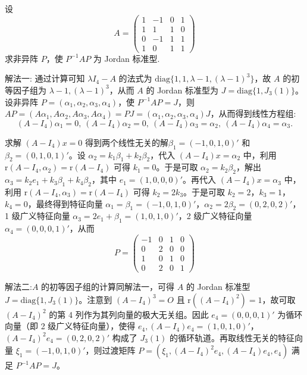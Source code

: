 \documentclass[../../main.tex]{subfiles}
\begin{document}
\begin{example}
设
\[
A = \begin{pmatrix}
1 & -1 & 0 & 1 \\
1 & 1 & 1 & 0 \\
0 & -1 & 1 & 1 \\
1 & 0 & 1 & 1
\end{pmatrix}
\]
求非异阵 $P$，使 $P^{-1}AP$ 为 Jordan 标准型.
\end{example}
\begin{solution}
{\color{blue}解法一:}
通过计算可知 $\lambda I_4 - A$ 的法式为 $\mathrm{diag}\{1,1,\lambda - 1,(\lambda - 1)^3\}$，故 $A$ 的初等因子组为 $\lambda - 1,(\lambda - 1)^3$，从而 $A$ 的 Jordan 标准型为 $J = \mathrm{diag}\{1,J_3(1)\}$。设非异阵 $P = (\alpha_1,\alpha_2,\alpha_3,\alpha_4)$，使 $P^{-1}AP = J$，则 $AP = (A\alpha_1,A\alpha_2,A\alpha_3,A\alpha_4) = PJ = (\alpha_1,\alpha_2,\alpha_3,\alpha_4)J$，从而得到线性方程组:
\[(A - I_4)\alpha_1 = 0,\ (A - I_4)\alpha_2 = 0,\ (A - I_4)\alpha_3 = \alpha_2,\ (A - I_4)\alpha_4 = \alpha_3.\]

求解 $(A - I_4)x = 0$ 得到两个线性无关的解$\beta_1 = (-1,0,1,0)'$ 和 $\beta_2 = (0,1,0,1)'$。设 $\alpha_2 = k_1\beta_1 + k_2\beta_2$，代入 $(A - I_4)x = \alpha_2$ 中，利用 $\mathrm{r}(A - I_4,\alpha_2) = \mathrm{r}(A - I_4)$ 可得 $k_1 = 0$。于是可取 $\alpha_2 = k_2\beta_2$，解出 $\alpha_3 = k_2e_1 + k_3\beta_1 + k_4\beta_2$，其中 $e_1 = (1,0,0,0)'$。再代入 $(A - I_4)x = \alpha_3$ 中，利用 $\mathrm{r}(A - I_4,\alpha_3) = \mathrm{r}(A - I_4)$ 可得 $k_2 = 2k_3$。于是可取 $k_2 = 2$，$k_3 = 1$，$k_4 = 0$，最终得到特征向量 $\alpha_1 = \beta_1 = (-1,0,1,0)'$，$\alpha_2 = 2\beta_2 = (0,2,0,2)'$，1 级广义特征向量 $\alpha_3 = 2e_1 + \beta_1 = (1,0,1,0)'$，2 级广义特征向量 $\alpha_4 = (0,0,0,1)'$，从而
\[
P = \begin{pmatrix}
-1 & 0 & 1 & 0 \\
0 & 2 & 0 & 0 \\
1 & 0 & 1 & 0 \\
0 & 2 & 0 & 1
\end{pmatrix}
\]

{\color{blue}解法二:}$A$ 的初等因子组的计算同解法一，可得 $A$ 的 Jordan 标准型 $J = \mathrm{diag}\{1,J_3(1)\}$。注意到 $(A - I_4)^3 = O$ 且 $\mathrm{r}((A - I_4)^2) = 1$，故可取 $(A - I_4)^2$ 的第 4 列作为其列向量的极大无关组。因此 $e_4 = (0,0,0,1)'$ 为循环向量（即 2 级广义特征向量），使得 $e_4,(A - I_4)e_4 = (1,0,1,0)'$，$(A - I_4)^2e_4 = (0,2,0,2)'$ 构成了 $J_3(1)$ 的循环轨道。再取线性无关的特征向量 $\xi_1 = (-1,0,1,0)'$，则过渡矩阵 $P = (\xi_1,(A - I_4)^2e_4,(A - I_4)e_4,e_4)$ 满足 $P^{-1}AP = J$。
\end{solution}
\end{document}

